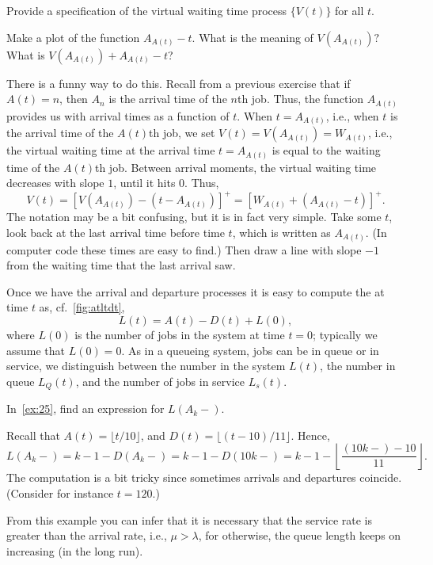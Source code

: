 \begin{exercise}
 Provide a specification of the virtual waiting time process $\{V(t)\}$ for
 all $t$.
\begin{hint}Make a plot of the function $A_{A(t)}-t$. What is the meaning of $V(A_{A(t)})?$ What is
$V(A_{A(t)}) + A_{A(t)}-t$?
\end{hint}
\begin{solution}
 There is a funny way to do this.
 Recall from a previous exercise that if $A(t)=n$, then $A_n$ is the arrival time of the $n$th job.
 Thus, the function $A_{A(t)}$ provides us with arrival times as a function of $t$.
 When $t=A_{A(t)}$, i.e., when $t$ is the arrival time of the $A(t)$th job, we set $V(t) = V(A_{A(t)}) = W_{A(t)}$, i.e., the virtual waiting time at the arrival time $t=A_{A(t)}$ is equal to the waiting time of the $A(t)$th job.
 Between arrival moments, the virtual waiting time decreases with slope $1$, until it hits 0.
 Thus,
 \begin{equation*}
 V(t) 
= [V(A_{A(t)}) - (t-A_{A(t)})]^+= [W_{A(t)} + (A_{A(t)}-t)]^+.
 \end{equation*}
 The notation may be a bit confusing, but it is in fact very simple.
 Take some $t$, look back at the last arrival time before time $t$, which is written as $A_{A(t)}$.
 (In computer code these times are easy to find.)
 Then draw a line with slope $-1$ from the waiting time that the last arrival saw.
\end{solution}
\end{exercise}

Once we have the arrival and departure processes it is easy to compute the  at time $t$ as, cf.~\cref{fig:atltdt},
\begin{equation}\label{eq:14}
 L(t) = A(t) - D(t) + L(0),
\end{equation}
where $L(0)$ is the number of jobs in the system at time $t=0$; typically we assume that $L(0)=0$.
As in a queueing system, jobs can be in queue or in service, we distinguish between the number in the system $L(t)$, the number in queue $L_Q(t)$, and the number of jobs in service $L_s(t)$.

\begin{extra}
In~\cref{ex:25},  find an expression for $L(A_k-)$. 
\begin{solution}
Recall that $A(t) = \lfloor t/10\rfloor$, and $D(t) = \lfloor (t-10)/11 \rfloor$.
  Hence,
 \begin{equation*}
 L(A_k-) = k-1 - D(A_k-) = k- 1 - D(10k-) = k- 1 - \left \lfloor \frac{(10k-)-10}{11} \right \rfloor.
 \end{equation*}
 The computation is a bit tricky since sometimes arrivals and departures coincide. (Consider for instance $t=120$.)

From this example you can infer that it is necessary that the service rate is greater than the arrival rate, i.e., $\mu > \lambda$, for otherwise, the queue length keeps on increasing (in the long run).
\end{solution}
\end{extra}

